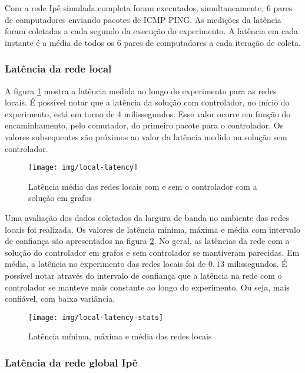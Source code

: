 Com a rede Ipê simulada completa foram executados, simultaneamente, 
6 pares de computadores enviando pacotes de ICMP PING. 
As medições da latência foram coletadas a cada segundo da execução do 
experimento. 
A latência em cada instante é a média de todos os 6 pares de computadores
a cada iteração de coleta.

\subsubsection{Latência da rede local}

A figura \ref{fig:local-latency} mostra a latência medida ao longo do 
experimento para as redes locais.
É possível notar que a latência da solução com controlador, no início do 
experimento, está em torno de 4 milissegundos.
Esse valor ocorre em função do encaminhamento, pelo comutador, do primeiro 
pacote para o controlador. 
Os valores subsequentes são próximos ao valor da latência medido na solução 
sem controlador.

\begin{figure}[!htb]
    \centering
    \label{fig:local-latency}
    \texttt{[image: img/local-latency]}
    \caption{Latência média das redes locais com e sem o controlador com a 
    solução em grafos}
\end{figure}

Uma avaliação dos dados coletados da largura de banda no ambiente das 
redes locais foi realizada.
Os valores de latência mínima, máxima e média com intervalo de confiança 
são apresentados na figura \ref{fig:local-latency-stats}.
No geral, as latências da rede com a solução do controlador em grafos e 
sem controlador se mantiveram parecidas. 
Em média, a latência no experimento das redes locais foi de 
$0,13$ milissegundos.
É possível notar através do intervalo de confiança que a latência na rede 
com o controlador se manteve mais constante ao longo do experimento.
Ou seja, mais confiável, com baixa variância.

\begin{figure}[!htb]
    \centering
    \label{fig:local-latency-stats}
    \texttt{[image: img/local-latency-stats]}
    \caption{Latência mínima, máxima e média das redes locais}
\end{figure}


\subsubsection{Latência da rede global Ipê}

